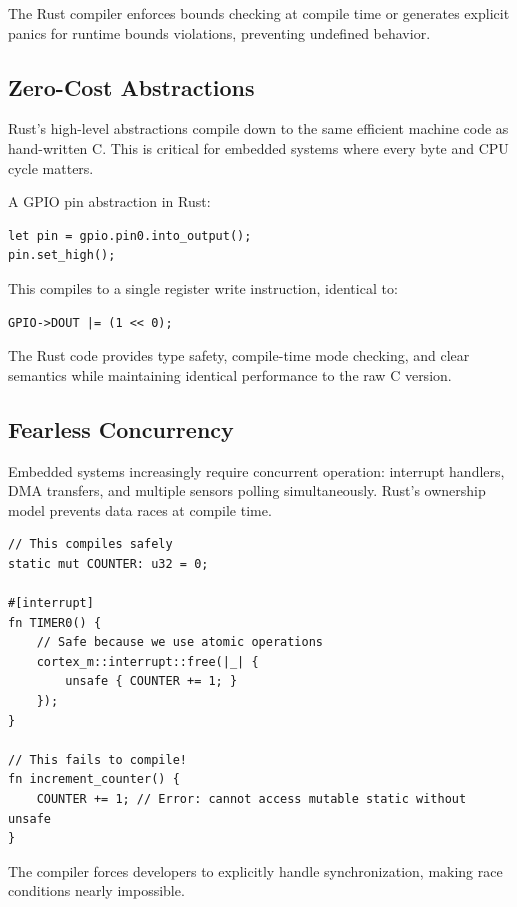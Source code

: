 The Rust compiler enforces bounds checking at compile time or generates explicit panics for runtime bounds violations, preventing undefined behavior.

\subsection{Zero-Cost Abstractions}

Rust's high-level abstractions compile down to the same efficient machine code as hand-written C. This is critical for embedded systems where every byte and CPU cycle matters.

\begin{example}
A GPIO pin abstraction in Rust:

\begin{verbatim}
let pin = gpio.pin0.into_output();
pin.set_high();
\end{verbatim}

This compiles to a single register write instruction, identical to:

\begin{verbatim}
GPIO->DOUT |= (1 << 0);
\end{verbatim}
\end{example}

The Rust code provides type safety, compile-time mode checking, and clear semantics while maintaining identical performance to the raw C version.

\subsection{Fearless Concurrency}

Embedded systems increasingly require concurrent operation: interrupt handlers, DMA transfers, and multiple sensors polling simultaneously. Rust's ownership model prevents data races at compile time.

\begin{verbatim}
// This compiles safely
static mut COUNTER: u32 = 0;

#[interrupt]
fn TIMER0() {
    // Safe because we use atomic operations
    cortex_m::interrupt::free(|_| {
        unsafe { COUNTER += 1; }
    });
}

// This fails to compile!
fn increment_counter() {
    COUNTER += 1; // Error: cannot access mutable static without unsafe
}
\end{verbatim}

The compiler forces developers to explicitly handle synchronization, making race conditions nearly impossible.

